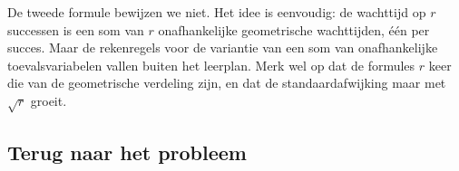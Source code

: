 De tweede formule bewijzen we niet. Het idee is eenvoudig: de wachttijd op $r$ successen is een som van $r$ onafhankelijke geometrische wachttijden, één per succes. Maar de rekenregels voor de variantie van een som van onafhankelijke toevalsvariabelen vallen buiten het leerplan. Merk wel op dat de formules $r$ keer die van de geometrische verdeling zijn, en dat de standaardafwijking maar met $\sqrt r$ groeit.


\begin{oefeningen}
\end{oefeningen}

\subsection{Terug naar het probleem}

